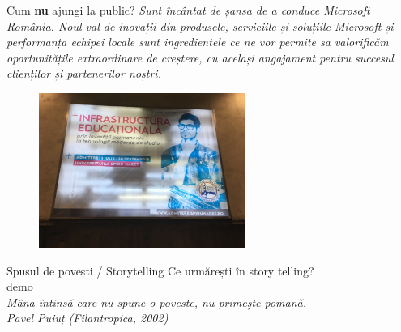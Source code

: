 \documentclass{beamer}
\begin{document}
\begin{frame}{Cum \textbf{nu} ajungi la public?}
  \centering
  \pause
  \textit{Sunt încântat de șansa de a conduce Microsoft România. Noul val de inovații din produsele, serviciile și soluțiile Microsoft și performanța echipei locale sunt ingredientele ce ne vor permite sa valorificăm oportunitățile extraordinare de creștere, cu același angajament pentru succesul clienților și partenerilor noștri.}\\
  \pause
  \begin{figure}
    \includegraphics[width=0.6\textwidth]{img/promovare-spiru-haret}
  \end{figure}
\end{frame}

\begin{frame}{Spusul de povești / Storytelling}
  \centering
  \pause
  Ce urmărești în story telling?\\
  \pause
  \vspace{3mm}
  demo\\
  \pause
  \vspace{3mm}
  \textit{Mâna întinsă care nu spune o poveste, nu primește pomană.}\\
  \vspace{3mm}
  \hfill \textit{Pavel Puiuț (Filantropica, 2002)}
\end{frame}
\end{document}
